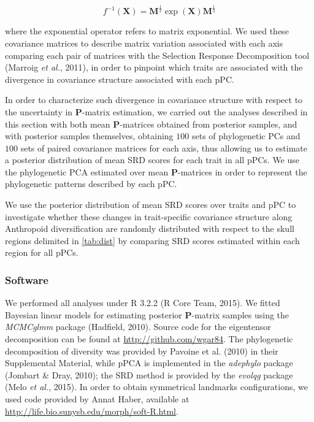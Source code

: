 \documentclass[12pt,twoside]{report}
\begin{document}
\begin{equation}
f^{-1}(\mathbf{X}) = \mathbf{M}^{\frac{1}{2}}\exp(\mathbf{X})\mathbf{M}^{\frac{1}{2}}
\label{eq:inv}
\end{equation}

where the exponential operator refers to matrix exponential. We used
these covariance matrices to describe matrix variation associated with
each axis comparing each pair of matrices with the Selection Response
Decomposition tool (Marroig \emph{et al.}, 2011), in order to pinpoint
which traits are associated with the divergence in covariance structure
associated with each pPC.

In order to characterize such divergence in covariance structure with
respect to the uncertainty in $\mathbf{P}$-matrix estimation, we carried
out the analyses described in this section with both mean
$\mathbf{P}$-matrices obtained from posterior samples, and with
posterior samples themselves, obtaining $100$ sets of phylogenetic PCs
and $100$ sets of paired covariance matrices for each axis, thus
allowing us to estimate a posterior distribution of mean SRD scores for
each trait in all pPCs. We use the phylogenetic PCA estimated over mean
$\mathbf{P}$-matrices in order to represent the phylogenetic patterns
described by each pPC.

We use the posterior distribution of mean SRD scores over traits and pPC
to investigate whether these changes in trait-specific covariance
structure along Anthropoid diversification are randomly distributed with
respect to the skull regions delimited in \autoref{tab:dist} by
comparing SRD scores estimated within each region for all pPCs.

\subsubsection{Software}\label{software-2}

We performed all analyses under R 3.2.2 (R Core Team, 2015). We fitted
Bayesian linear models for estimating posterior $\mathbf{P}$-matrix
samples using the \emph{MCMCglmm} package (Hadfield, 2010). Source code
for the eigentensor decomposition can be found at
\url{http://github.com/wgar84}. The phylogenetic decomposition of
diversity was provided by Pavoine et al. (2010) in their Supplemental
Material, while pPCA is implemented in the \emph{adephylo} package
(Jombart \& Dray, 2010); the SRD method is provided by the \emph{evolqg}
package (Melo \emph{et al.}, 2015). In order to obtain symmetrical
landmarks configurations, we used code provided by Annat Haber,
available at \url{http://life.bio.sunysb.edu/morph/soft-R.html}.
\end{document}
